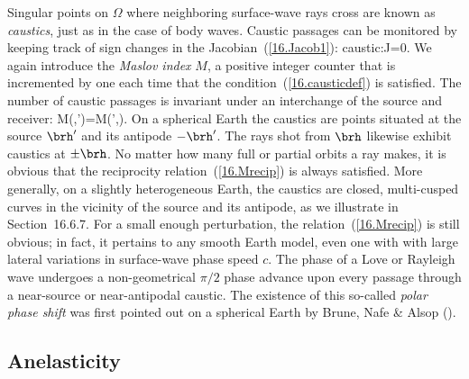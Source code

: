 Singular points on $\Omega$ where neighboring
surface-wave rays cross are known as {\em caustics\/},
%
just as in the case of body waves.  Caustic passages
can be monitored by keeping track of sign changes in
the Jacobian~(\ref{16.Jacob1}):
\eq \label{16.causticdef}
\mbox{caustic:}\quad J=0.
\en
We again introduce the {\em Maslov index\/} $M$, a positive
integer counter that is incremented by one each time that
the condition~(\ref{16.causticdef}) is satisfied.  The number
of caustic passages is invariant under an interchange of the
%
%
source and receiver:
\eq \label{16.Mrecip}
M(\brh,\brh')=M(\brh',\brh).
\en
On a spherical Earth the caustics are points situated at
the source $\brh'$ and its antipode $-\brh'$.  The rays
shot from $\brh$ likewise exhibit caustics at $\pm\brh$.
No matter how many full or partial orbits a ray makes,
it is obvious that the reciprocity relation~(\ref{16.Mrecip})
is always satisfied. More generally, on a slightly
heterogeneous Earth, the caustics are closed,
multi-cusped curves in the vicinity of the source
and its antipode, as we illustrate in
Section~16.6.7.  For a small
enough perturbation, the relation~(\ref{16.Mrecip})
is still obvious; in fact, it pertains to any smooth
Earth model, even one with with large lateral variations
in surface-wave phase speed $c$.  The phase of a Love or Rayleigh
wave undergoes a non-geometrical $\pi/2$ phase advance
upon every passage through a near-source or near-antipodal
caustic.  The existence of this so-called {\em polar phase shift\/}
%
%
was first pointed out on a spherical Earth by Brune, Nafe \& Alsop
(\citeyear{brune&al61}).
%
%

\subsection{Anelasticity}
%
%

